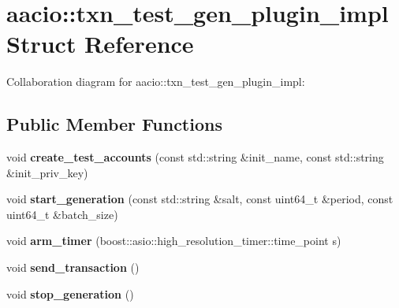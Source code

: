 \hypertarget{structaacio_1_1txn__test__gen__plugin__impl}{}\section{aacio\+:\+:txn\+\_\+test\+\_\+gen\+\_\+plugin\+\_\+impl Struct Reference}
\label{structaacio_1_1txn__test__gen__plugin__impl}


Collaboration diagram for aacio\+:\+:txn\+\_\+test\+\_\+gen\+\_\+plugin\+\_\+impl\+:
\subsection*{Public Member Functions}
\begin{DoxyCompactItemize}
\item 
\mbox{\label{structaacio_1_1txn__test__gen__plugin__impl_a912fa591762330729cd822088cc82c35}} 
void {\bfseries create\+\_\+test\+\_\+accounts} (const std\+::string \&init\+\_\+name, const std\+::string \&init\+\_\+priv\+\_\+key)
\item 
\mbox{\label{structaacio_1_1txn__test__gen__plugin__impl_a010793a91367ca93e941ce31adc8a071}} 
void {\bfseries start\+\_\+generation} (const std\+::string \&salt, const uint64\+\_\+t \&period, const uint64\+\_\+t \&batch\+\_\+size)
\item 
\mbox{\label{structaacio_1_1txn__test__gen__plugin__impl_a20df2cd27c6e188438103a97fa34fccc}} 
void {\bfseries arm\+\_\+timer} (boost\+::asio\+::high\+\_\+resolution\+\_\+timer\+::time\+\_\+point s)
\item 
\mbox{\label{structaacio_1_1txn__test__gen__plugin__impl_a2e921fa36fbf022576313afc8dac4d34}} 
void {\bfseries send\+\_\+transaction} ()
\item 
\mbox{\label{structaacio_1_1txn__test__gen__plugin__impl_afb7b1f030dce4a576ec26a03be513450}} 
void {\bfseries stop\+\_\+generation} ()
\end{DoxyCompactItemize}
